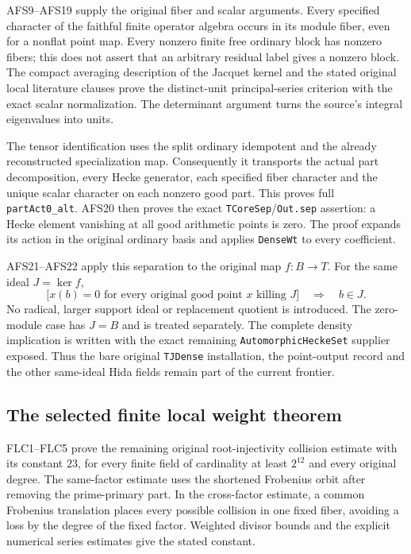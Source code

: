 \documentclass[11pt,a4paper]{article}
\numberwithin{equation}{section}
\theoremstyle{remark}\newtheorem{remark}[theorem]{Remark}
\begin{document}
AFS9--AFS19 supply the original fiber and scalar arguments. Every
specified character of the faithful finite operator algebra occurs
in its module fiber, even for a nonflat point map. Every nonzero
finite free ordinary block has nonzero fibers; this does not assert
that an arbitrary residual label gives a nonzero block. The compact
averaging description of the Jacquet kernel and the stated original
local literature clauses prove the distinct-unit principal-series
criterion with the exact scalar normalization. The determinant
argument turns the source's integral eigenvalues into units.

The tensor identification uses the split ordinary idempotent and
the already reconstructed specialization map. Consequently it
transports the actual part decomposition, every Hecke generator,
each specified fiber character and the unique scalar character on
each nonzero good part. This proves full \texttt{part\allowbreak Act0\_\allowbreak alt}.
AFS20 then proves the exact \texttt{TCore\allowbreak Sep}/\texttt{Out.\allowbreak sep}
assertion: a Hecke element vanishing at all good arithmetic points
is zero. The proof expands its action in the original ordinary
basis and applies \texttt{Dense\allowbreak Wt} to every coefficient.

AFS21--AFS22 apply this separation to the original map $f:B\to T$.
For the same ideal $J=\ker f$,
\[
 \bigl[x(b)=0\text{ for every original good point }x
                  \text{ killing }J\bigr]\quad\Longrightarrow\quad b\in J.
\]
No radical, larger support ideal or replacement quotient is introduced.
The zero-module case has $J=B$ and is treated separately. The complete
density implication is written with the exact remaining
\texttt{Automorphic\allowbreak Hecke\allowbreak Set} supplier exposed. Thus the bare original
\texttt{TJDense} installation, the point-output record and the other
same-ideal Hida fields remain part of the current frontier.

\subsection{The selected finite local weight theorem}

FLC1--FLC5 prove the remaining original root-injectivity collision
estimate with its constant $23$, for every finite field of cardinality
at least $2^{12}$ and every original degree. The same-factor estimate
uses the shortened Frobenius orbit after removing the prime-primary
part. In the cross-factor estimate, a common Frobenius translation
places every possible collision in one fixed fiber, avoiding a loss
by the degree of the fixed factor. Weighted divisor bounds and the
explicit numerical series estimates give the stated constant.
\end{document}
